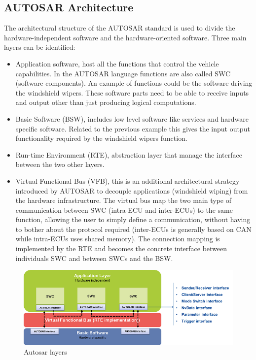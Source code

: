 \documentclass[../main.tex]{subfiles}
\begin{document}
\subsection{AUTOSAR Architecture}
The architectural structure of the \gls{AUTOSAR} standard is used to divide the hardware-independent software and the hardware-oriented software. Three main layers can be identified:
\begin{itemize}
    \item Application software, host all the functions that control the vehicle capabilities. In the \gls{AUTOSAR} language functions are also called \gls{SWC} (software components). An example of functions could be the software driving the windshield wipers. These software parts need to be able to receive inputs and output other than just producing logical computations.
    \item Basic Software (\gls{BSW}), includes low level software like services and hardware specific software. Related to the previous example this gives the input output functionality required by the windshield wipers function. 
    \item Run-time Environment (\gls{RTE}), abstraction layer that manage the interface between the two other layers. 
    \item Virtual Functional Bus (\gls{VFB}), this is an additional architectural strategy introduced by \gls{AUTOSAR} to decouple applications (windshield wiping) from the hardware infrastructure. The virtual bus map the two main type of communication between \gls{SWC} (intra-\gls{ECU} and inter-\gls{ECU}s) to the same function, allowing the user to simply define a communication, without having to bother about the protocol required (inter-\gls{ECU}s is generally based on \gls{CAN} while intra-\gls{ECU}s uses shared memory). The connection mapping is implemented by the RTE and becomes the concrete interface between individuals \gls{SWC} and between \gls{SWC}s and the \gls{BSW}.
\end{itemize}

\begin{figure}[h]
    \centering
    \includegraphics[width=\linewidth]{images_folder/878x-autosar_layers.b68.png}
    \caption{Autosar layers}
    \label{fig:AUTLAY}
\end{figure}
\end{document}
